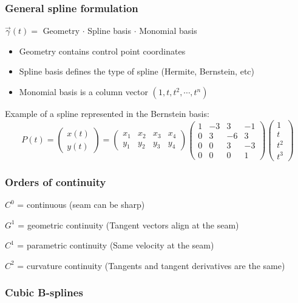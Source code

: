 \documentclass[12pt]{article}
\begin{document}
\subsubsection{General spline formulation}

$\vec \gamma(t) =$ Geometry $\cdot$ Spline basis $\cdot$ Monomial basis
\begin{itemize}
    \item Geometry contains control point coordinates
    \item Spline basis defines the type of spline (Hermite, Bernstein, etc)
    \item Monomial basis is a column vector $(1,t,t^2,\cdots,t^n)$
\end{itemize}

Example of a spline represented in the Bernstein basis:
\[
    P(t) =
    \begin{pmatrix}
        x(t)\\
        y(t)
    \end{pmatrix}
    =
    \begin{pmatrix}
        x_1 & x_2 & x_3 & x_4\\
        y_1 & y_2 & y_3 & y_4
    \end{pmatrix}
    \begin{pmatrix}
        1 & -3 & 3 & -1\\
        0 & 3 & -6 & 3\\
        0 & 0 & 3 & -3\\
        0 & 0 & 0 & 1
    \end{pmatrix}
    \begin{pmatrix}
        1\\
        t\\
        t^2\\
        t^3
    \end{pmatrix}
\]

\subsubsection{Orders of continuity}

$C^0$ = continuous (seam can be sharp)

$G^1$ = geometric continuity (Tangent vectors align at the seam)

$C^1$ = parametric continuity (Same velocity at the seam)

$C^2$ = curvature continuity (Tangents and tangent derivatives are the same)

\subsubsection{Cubic B-splines}
\end{document}
